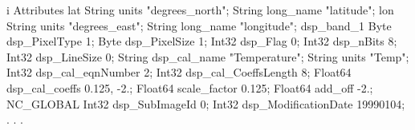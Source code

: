 \begin{vcode}{i}
Attributes {
    lat {
        String units "degrees_north";
        String long_name "latitude";
    }
    lon {
        String units "degrees_east";
        String long_name "longitude";
    }
    dsp_band_1 {
        Byte dsp_PixelType 1;
        Byte dsp_PixelSize 1;
        Int32 dsp_Flag 0;
        Int32 dsp_nBits 8;
        Int32 dsp_LineSize 0;
        String dsp_cal_name "Temperature";
        String units "Temp";
        Int32 dsp_cal_eqnNumber 2;
        Int32 dsp_cal_CoeffsLength 8;
        Float64 dsp_cal_coeffs 0.125, -2.;
        Float64 scale_factor 0.125;
        Float64 add_off -2.;
    }
    NC_GLOBAL {
        Int32 dsp_SubImageId 0;
        Int32 dsp_ModificationDate 19990104;
        .
        .
        .
    }
}
\end{vcode}
